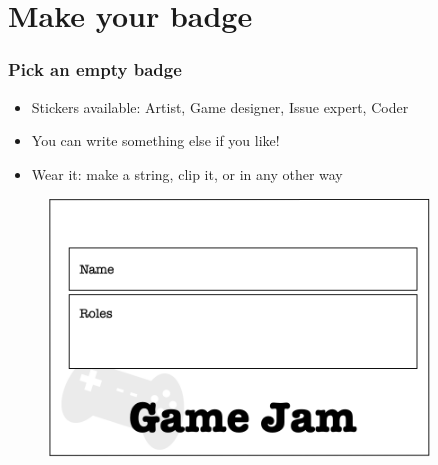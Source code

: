 \documentclass{beamer}
\begin{document}
\section{Make your badge}
\begin{frame}
\frametitle{Pick an empty badge}
\begin{itemize}
    \item Stickers available: Artist, Game designer, Issue expert, Coder
    \item You can write something else if you like!
    \item Wear it: make a string, clip it, or in any other way
\end{itemize}
\begin{figure}
\includegraphics[width=0.9\textwidth, angle=10]{figures/badge.png}
\end{figure}
\end{frame}
\end{document}
